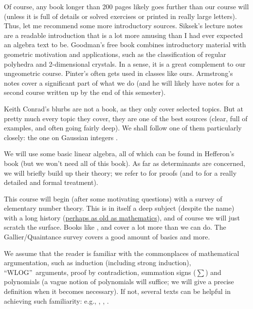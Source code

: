 \documentclass[numbers=enddot,12pt,final,onecolumn,notitlepage]{scrartcl}%
\newcounter{exer}
\numberwithin{exer}{section}
\theoremstyle{definition}
\let\sumnonlimits\sum
\renewcommand{\sum}{\sumnonlimits\limits}
\begin{document}
Of course, any book longer than 200 pages likely goes further than our course
will (unless it is full of details or solved exercises or printed in really
large letters). Thus, let me recommend some more introductory sources.
Siksek's lecture notes \cite{Siksek} are a readable introduction that is a lot
more amusing than I had ever expected an algebra text to be. Goodman's free
book \cite{Goodman} combines introductory material with geometric motivation
and applications, such as the classification of regular polyhedra and
2-dimensional crystals. In a sense, it is a great complement to our
ungeometric course. Pinter's \cite{Pinter} often gets used in classes like
ours. Armstrong's notes \cite{Armstrong} cover a significant part of what we
do (and he will likely have notes for a second course written up by the end of
this semester).

Keith Conrad's blurbs \cite{Conrad*} are not a book, as they only cover
selected topics. But at pretty much every topic they cover, they are one of
the best sources (clear, full of examples, and often going fairly deep). We
shall follow one of them particularly closely: the one on Gaussian integers
\cite{Conrad-Gauss}.

We will use some basic linear algebra, all of which can be found in Hefferon's
book \cite{Hefferon} (but we won't need all of this book). As far as
determinants are concerned, we will briefly build up their theory; we refer to
\cite[Section 12 \& Appendix B]{Strickland} for proofs (and to \cite[Chapter
6]{detnotes} for a really detailed and formal treatment).

This course will begin (after some motivating questions) with a survey of
elementary number theory. This is in itself a deep subject (despite the name)
with a long history (\href{https://en.wikipedia.org/wiki/Plimpton_322}{perhaps
as old as mathematics}), and of course we will just scratch the surface. Books
like \cite{NiZuMo}, \cite{Burton} and \cite{Uspensky-Heaslet} cover a lot more
than we can do. The Gallier/Quaintance survey \cite{Gallier-RSA} covers a good
amount of basics and more.

We assume that the reader is familiar with the commonplaces of mathematical
argumentation, such as induction (including strong induction),
\textquotedblleft WLOG\textquotedblright\ arguments, proof by contradiction,
summation signs ($\sum$) and polynomials (a vague notion of polynomials will
suffice; we will give a precise definition when it becomes necessary). If not,
several texts can be helpful in achieving such familiarity: e.g.,
\cite[particularly Chapters 1--5]{LeLeMe}, \cite{Hammack}, \cite{Day}.
\end{document}
